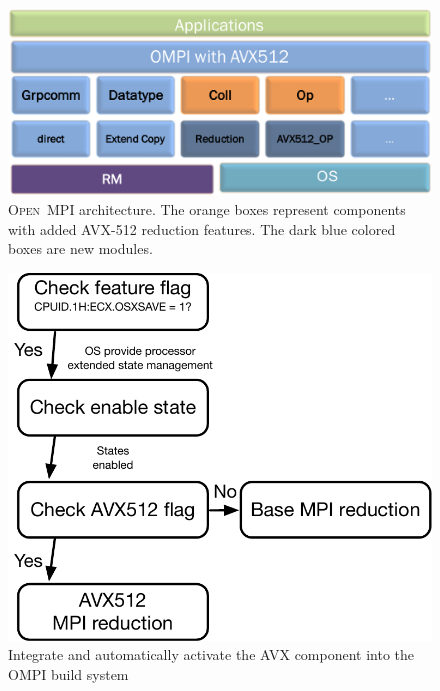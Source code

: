 \documentclass[sigconf]{acmart}
\newcommand{\ompi}[0]{\textsc{Open~MPI}\xspace}
\begin{document}
\begin{figure}[h]
    \centering
    \includegraphics[width=\linewidth]{avx-mca.pdf}
    \caption{\ompi architecture. The orange boxes represent components with added AVX-512 reduction features. The dark blue colored boxes are new modules.}
    \label{fig:avx_mca}
\end{figure}

\begin{figure}[h]
    \centering
    \includegraphics[scale=.45]{512-flow.pdf}
    \caption{Integrate and automatically activate the AVX component into the OMPI build system}
    \label{fig:512flow}
\end{figure}
\end{document}
